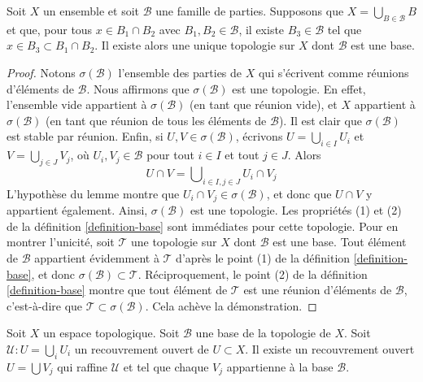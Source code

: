 \begin{lemma}
\label{lemma-make-base}
Soit $X$ un ensemble et soit $\mathcal{B}$ une famille de parties.
Supposons que $X = \bigcup_{B \in \mathcal{B}} B$ et que, pour tous
$x \in B_1 \cap B_2$ avec $B_1, B_2 \in \mathcal{B}$, il existe
$B_3 \in \mathcal{B}$ tel que $x \in B_3 \subset B_1 \cap B_2$.
Il existe alors une unique topologie sur $X$ dont $\mathcal{B}$ est une base.
\end{lemma}

\begin{proof}
Notons $\sigma(\mathcal B)$ l'ensemble des parties de $X$ qui s'écrivent
comme réunions d'éléments de $\mathcal B$. Nous affirmons que
$\sigma(\mathcal{B})$ est une topologie. En effet, l'ensemble vide appartient
à $\sigma(\mathcal{B})$ (en tant que réunion vide), et $X$ appartient à
$\sigma(\mathcal{B})$ (en tant que réunion de tous les éléments de
$\mathcal{B}$). Il est clair que $\sigma(\mathcal{B})$ est stable par réunion.
Enfin, si $U, V \in \sigma(\mathcal{B})$, écrivons
$U = \bigcup_{i \in I} U_i$ et $V = \bigcup_{j \in J} V_j$, où
$U_i, V_j \in \mathcal{B}$ pour tout $i \in I$ et tout $j \in J$.
Alors
$$
U \cap V = \bigcup\nolimits_{i \in I, j \in J}
U_i \cap V_j
$$
L'hypothèse du lemme montre que $U_i \cap V_j \in \sigma(\mathcal{B})$,
et donc que $U \cap V$ y appartient également. Ainsi,
$\sigma(\mathcal{B})$ est une topologie.
Les propriétés (1) et (2) de la définition \ref{definition-base} sont
immédiates pour cette topologie. Pour en montrer l'unicité, soit $\mathcal T$
une topologie sur $X$ dont $\mathcal B$ est une base. Tout élément de
$\mathcal{B}$ appartient évidemment à $\mathcal{T}$ d'après le point (1) de
la définition \ref{definition-base}, et donc
$\sigma(\mathcal{B}) \subset \mathcal{T}$. Réciproquement, le point (2) de
la définition \ref{definition-base} montre que tout élément de $\mathcal{T}$
est une réunion d'éléments de $\mathcal{B}$, c'est-à-dire que
$\mathcal{T} \subset \sigma(\mathcal{B})$. Cela achève la démonstration.
\end{proof}

\begin{lemma}
\label{lemma-refine-covering-basis}
Soit $X$ un espace topologique.
Soit $\mathcal{B}$ une base de la topologie de $X$.
Soit $\mathcal{U} : U = \bigcup_i U_i$ un recouvrement ouvert de
$U \subset X$. Il existe un recouvrement ouvert $U = \bigcup V_j$ qui
raffine $\mathcal{U}$ et tel que chaque $V_j$ appartienne à la base
$\mathcal{B}$.
\end{lemma}

